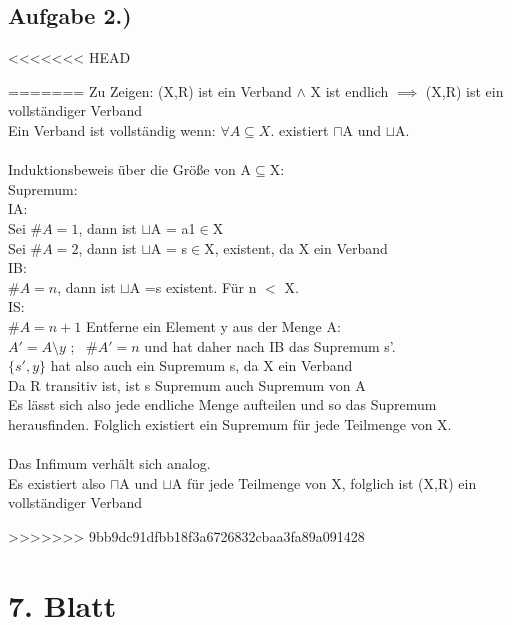 \documentclass[10pt,a4paper,german,landscape,fleqn]{article} \usepackage[utf8]{inputenc} %
\begin{document}
\subsection*{Aufgabe 2.)}
<<<<<<< HEAD

=======
Zu Zeigen: (X,R) ist ein Verband $ \land $ X ist endlich $\implies$  (X,R) ist ein vollständiger Verband \\
Ein Verband ist vollständig wenn:  $\forall A \subseteq X.$ existiert $\sqcap$A und $\sqcup$A. \\ \\
Induktionsbeweis über die Größe von A$\subseteq$X:\\
Supremum: \\
IA: \\
Sei $\#A=1$, dann ist $\sqcup$A = a1$\in$X \\
Sei $\#A=2$, dann ist $\sqcup$A = s$\in$X, existent, da X ein Verband\\
IB:\\
$\#A=n$, dann ist $\sqcup$A =s existent. Für n $<$ X. \\
IS: \\
$\#A=n+1$ Entferne ein Element y aus der Menge A: \\
$A'=A\setminus y$  ; \ $\#A'=n$ und hat daher nach IB das Supremum s'. \\
$\{ s',y \} $ hat also auch ein Supremum s, da X ein Verband \\
Da R transitiv ist, ist s Supremum auch Supremum von A  \\
Es lässt sich also jede endliche Menge aufteilen und so das Supremum herausfinden. Folglich existiert ein Supremum für jede Teilmenge von X. \\ \\
Das Infimum verhält sich analog. \\
Es existiert also $\sqcap$A und $\sqcup$A für jede Teilmenge von X, folglich ist (X,R) ein vollständiger Verband

\newpage
>>>>>>> 9bb9dc91dfbb18f3a6726832cbaa3fa89a091428
\section*{7. Blatt } %
\end{document}
